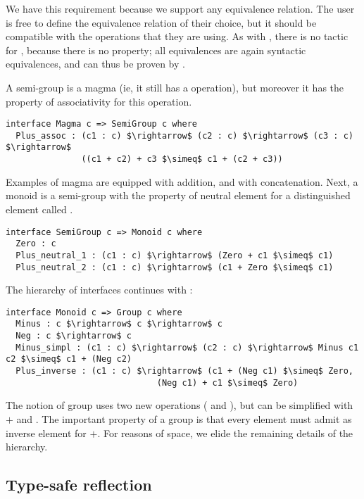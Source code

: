 We have this requirement because we support
any equivalence relation. The user is free to define the equivalence relation of their choice, but it should be compatible with the operations that they are using.
As with , there is no
tactic for , because there is no property; all
equivalences are again syntactic equivalences, and can thus be proven by
. 

A semi-group is a magma (ie, it still has a  operation), but moreover it has the property of associativity for this operation. 

\begin{lstlisting}
interface Magma c => SemiGroup c where
  Plus_assoc : (c1 : c) $\rightarrow$ (c2 : c) $\rightarrow$ (c3 : c) $\rightarrow$ 
               ((c1 + c2) + c3 $\simeq$ c1 + (c2 + c3))
\end{lstlisting}

\noindent
Examples of magma are  equipped with addition, and  with
concatenation.  Next, a monoid is a semi-group with the property of neutral element for a distinguished element called .

\begin{lstlisting}
interface SemiGroup c => Monoid c where
  Zero : c    
  Plus_neutral_1 : (c1 : c) $\rightarrow$ (Zero + c1 $\simeq$ c1)    
  Plus_neutral_2 : (c1 : c) $\rightarrow$ (c1 + Zero $\simeq$ c1)
\end{lstlisting}

\noindent
The hierarchy of interfaces continues with :

\begin{lstlisting}
interface Monoid c => Group c where
  Minus : c $\rightarrow$ c $\rightarrow$ c
  Neg : c $\rightarrow$ c
  Minus_simpl : (c1 : c) $\rightarrow$ (c2 : c) $\rightarrow$ Minus c1 c2 $\simeq$ c1 + (Neg c2) 
  Plus_inverse : (c1 : c) $\rightarrow$ (c1 + (Neg c1) $\simeq$ Zero, 
                              (Neg c1) + c1 $\simeq$ Zero)
\end{lstlisting}

The notion of group uses two new operations ( and ), but
 can be simplified with $+$ and .
The important property of a group is that every element  must admit
 as inverse element for $+$.
For reasons of space, we elide the remaining details of the hierarchy.

\subsection{Type-safe reflection}
\label{sect:typeSafeReflection}
			
